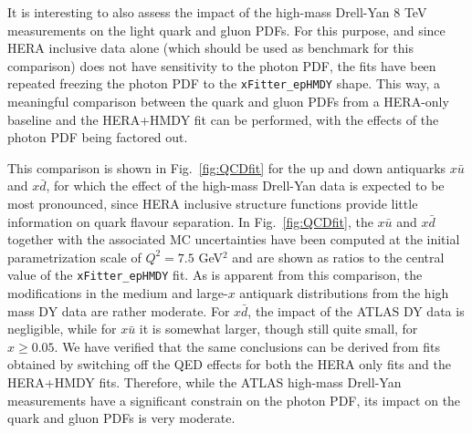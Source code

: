 It is interesting to also assess the impact of the high-mass Drell-Yan 8 TeV measurements on
the light quark and gluon PDFs.
%
For this purpose, and since HERA inclusive data alone (which should be used as
benchmark for this comparison) does not have sensitivity to the photon
PDF, the fits have been repeated freezing the photon PDF to the
{\tt xFitter\_epHMDY} shape.
%
This way, 
a meaningful comparison between the quark and gluon PDFs
from a HERA-only
baseline and the HERA+HMDY fit can be performed, with the effects of
the photon PDF being factored out.

This comparison is shown in Fig.~\ref{fig:QCDfit} for the up and down
antiquarks $x\bar{u}$ and $x\bar{d}$, for which the effect of the high-mass Drell-Yan data is
expected to be most pronounced, since HERA inclusive structure functions
provide little information on quark flavour separation.
%
In Fig.~\ref{fig:QCDfit}, the $x\bar{u}$ and $x\bar{d}$ together
with the associated MC uncertainties have been computed
at the initial parametrization scale of $Q^2=7.5$ GeV$^2$ and
are shown as ratios to the central value of the {\tt xFitter\_epHMDY}
fit.
%
As is apparent from this comparison, the modifications in the medium
and large-$x$ antiquark distributions from the high mass DY data are
rather moderate.
%
For $x\bar{d}$, the impact of the ATLAS DY data is negligible, while
for $x\bar{u}$ it is somewhat larger, though still quite small,
for $x\ge 0.05$.
%
We have verified that the same conclusions can be derived
from fits obtained by switching
off the QED effects for both the HERA only fits and the HERA+HMDY fits.
%
Therefore, while the ATLAS high-mass Drell-Yan measurements have a significant constrain
on the photon PDF, its impact on the quark and gluon PDFs is very moderate.

